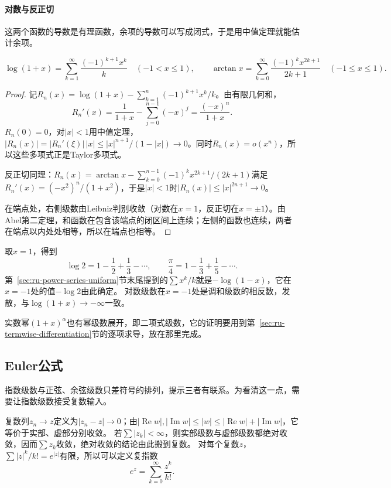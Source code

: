 \paragraph{对数与反正切}
这两个函数的导数是有理函数，余项的导数可以写成闭式，于是用中值定理就能估计余项。
\begin{theorem}[对数与反正切的展开]
\label{thm:ru-log-arctan-series}
\[
 \log(1+x)=\sum_{k=1}^\infty\frac{(-1)^{k+1}x^k}{k}\quad(-1<x\leq1),\qquad
 \arctan x=\sum_{k=0}^\infty\frac{(-1)^kx^{2k+1}}{2k+1}\quad(-1\leq x\leq1).
\]
\end{theorem}
\begin{proof}
记$R_n(x)=\log(1+x)-\sum_{k=1}^n(-1)^{k+1}x^k/k$。由有限几何和，
\[
 R_n'(x)=\frac1{1+x}-\sum_{j=0}^{n-1}(-x)^j=\frac{(-x)^n}{1+x}.
\]
$R_n(0)=0$，对$|x|<1$用中值定理，$|R_n(x)|=|R_n'(\xi)|\,|x|\leq|x|^{n+1}/(1-|x|)\to0$。同时$R_n(x)=o(x^n)$，所以这些多项式正是Taylor多项式。

反正切同理：$R_n(x)=\arctan x-\sum_{k=0}^{n-1}(-1)^kx^{2k+1}/(2k+1)$满足$R_n'(x)=(-x^2)^n/(1+x^2)$，于是$|x|<1$时$|R_n(x)|\leq|x|^{2n+1}\to0$。

在端点处，右侧级数由Leibniz判别收敛（对数在$x=1$，反正切在$x=\pm1$）。由Abel第二定理，和函数在包含该端点的闭区间上连续；左侧的函数也连续，两者在端点以内处处相等，所以在端点也相等。
\end{proof}
取$x=1$，得到
\[
 \log2=1-\frac12+\frac13-\cdots,\qquad\frac\pi4=1-\frac13+\frac15-\cdots.
\]
第~\ref{sec:ru-power-series-uniform}节末尾提到的$\sum x^k/k$就是$-\log(1-x)$，它在$x=-1$处的值$-\log2$由此确定。
对数级数在$x=-1$处是调和级数的相反数，发散，与$\log(1+x)\to-\infty$一致。

实数幂$(1+x)^\alpha$也有幂级数展开，即二项式级数，它的证明要用到第~\ref{sec:ru-termwise-differentiation}节的逐项求导，放在那里完成。

\subsection{Euler公式}
\label{sec:ru-euler-formula}
\label{sec:ru-trig-expansion-complex-exponential}

指数级数与正弦、余弦级数只差符号的排列，提示三者有联系。为看清这一点，需要让指数级数接受复数输入。

复数列$z_n\to z$定义为$|z_n-z|\to0$；由$|\operatorname{Re}w|,|\operatorname{Im}w|\leq|w|\leq|\operatorname{Re}w|+|\operatorname{Im}w|$，它等价于实部、虚部分别收敛。
若$\sum|z_k|<\infty$，则实部级数与虚部级数都绝对收敛，因而$\sum z_k$收敛，绝对收敛的结论由此搬到复数。
对每个复数$z$，$\sum|z|^k/k!=e^{|z|}$有限，所以可以定义复指数
\[
 e^z=\sum_{k=0}^\infty\frac{z^k}{k!}.
\]

